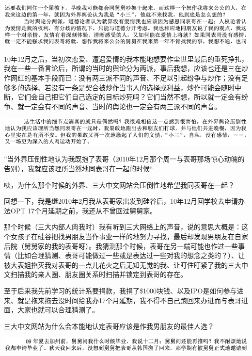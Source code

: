 \documentclass[9pt, b5paper]{article}
\begin{document}
\begin{center}
\includegraphics[width=.9\linewidth]{./pic/p1p48-1.png}
\end{center}

10年12月之后，当初次恋爱、遭遇爱情的我本能地想要作尘世里最后的垂死挣扎，我在一些一番言论后，所谓的当时的舆论分为两派，事后我想，应该也还是三在炒作网红的基本手段而已：没有两三派不同的声音、不足以引起纷争与炒作；没有足够多的选择、若没有一条是契合被炒作当事人的选择或利益，炒作可能会随时中断，它们会自己把它们自己选定的目标炒死吗？它们当然不想，所以就一定会有纷争、就一定会有不同的声音、当时的舆论也一定会有两三派不同的声音。

\begin{center}
\includegraphics[width=.9\linewidth]{./pic/p1p46-2.png}
\end{center}

”当外界压倒性地认为我既抱了表哥（2010年12月那个周一与表哥那场惊心动魄的告别），我就应该理所当然地同表哥在一起的时候“

咦，为什么那个时候的外界、三大中文网站会压倒性地希望我同表哥在一起？

回想一下，我是继2010年2月我从表哥家出发到硅谷后，10年12月回学校去申请办法OPT 17个月延期之前，我还从不曾回过舅舅家。 

那个时候（三大内部人肉我时）我有听到三大网络上的声音，说的意思大概是：这个女孩子在硅谷把找男朋友当作事业一样的地努力寻找，最后却发现男朋友在自家后院（舅舅家的我的表哥呀）。我猜测那个时候，表哥在另一端可能也作过一些事情（比如合理猜测、表哥可能做过一些或是表达过一些对我的想念之类的？）、让被大表姐掐灭我对表哥的一点儿花火之后无知无觉的我、让盯住盯紧了我的三大中文扫描我的亲人圈、朋友圈关系时扫描并锁定到表哥的存在。

至于后来我先前学习的统计系要捐款，我捐了\$1000块钱、以及IPO是如何参与进来、就是拖来拖去没时间给我办17个月延期，我不得不自己跑回来办进而与表哥进面，大家也就可以合理猜测了。 

三大中文网站为什么会本能地认定表哥应该是作我男朋友的最佳人选？

\begin{center}
\includegraphics[width=.9\linewidth]{./pic/p1p39-2.png}
\end{center}
\end{document}

